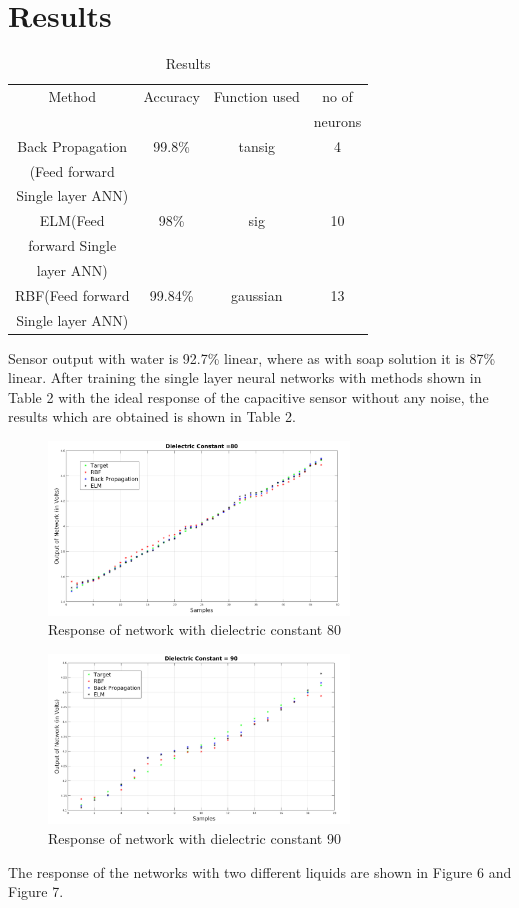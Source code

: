 \documentclass[conference]{IEEEtran}
\begin{document}
\section{Results}
\begin{table}
\begin{center}
  \begin{tabular}{ | c | c  | c | c |}
    \hline
    Method & Accuracy  & Function used & no of \\
    &&&neurons\\ \hline
    Back Propagation  & 99.8\% & tansig& 4 \\ 
    (Feed forward &&& \\
     Single layer ANN)&   &    &     \\ \hline
    ELM(Feed &98\% & sig &10\\ 
     forward Single &&& \\ 
     layer ANN)&&&\\ \hline
    RBF(Feed forward&99.84\%& gaussian& 13\\  
    Single layer ANN)&& &\\
    \hline
  \end{tabular}
\caption{Results\label{tab:b}}
\end{center}
\end{table}
Sensor output with water is 92.7\% linear, where as with soap solution it is 87\% linear. After training the single layer neural networks with methods shown in Table 2 with the ideal response of the capacitive sensor without any noise, the results which are obtained is shown in Table 2. 

\begin{figure}[h]
\includegraphics[width=8cm]{result1.png}
\centering
\caption{Response of network with dielectric constant 80}\label{Fig6}
\end{figure}

\begin{figure}[h]
\includegraphics[width=8cm]{result2.png}
\centering
\caption{Response of network with dielectric constant 90}\label{Fig7}
\end{figure}
The response of the networks with two different liquids are shown in Figure 6 and Figure 7.
\end{document}
